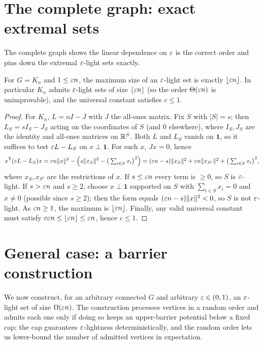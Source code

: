 \section{The complete graph: exact extremal sets}\label{sec:clique}

The complete graph shows the linear dependence on $\varepsilon$ is the correct order and pins down the
extremal $\varepsilon$-light sets exactly.

\begin{proposition}\label{prop:clique}
For $G=K_n$ and $1\le\varepsilon n$, the maximum size of an $\varepsilon$-light set is exactly
$\lfloor\varepsilon n\rfloor$. In particular $K_n$ admits $\varepsilon$-light sets of size $\lfloor\varepsilon n\rfloor$
(so the order $\Theta(\varepsilon n)$ is unimprovable), and the universal constant satisfies $c\le 1$.
\end{proposition}
\begin{proof}
For $K_n$, $L=nI-J$ with $J$ the all-ones matrix. Fix $S$ with $|S|=s$; then
$L_S=sI_S-J_S$ acting on the coordinates of $S$ (and $0$ elsewhere), where $I_S,J_S$ are the
identity and all-ones matrices on $\mathbb{R}^S$. Both $L$ and $L_S$ vanish on $\mathbf 1$, so it suffices
to test $\varepsilon L-L_S$ on $x\perp\mathbf 1$. For such $x$, $Jx=0$, hence
\[
x^{\mathsf T}(\varepsilon L-L_S)x=\varepsilon n\|x\|^2-\Big(s\|x_S\|^2-\big(\textstyle\sum_{i\in S}x_i\big)^2\Big)
=(\varepsilon n-s)\|x_S\|^2+\varepsilon n\|x_{S^{c}}\|^2+\big(\textstyle\sum_{i\in S}x_i\big)^2,
\]
where $x_S,x_{S^{c}}$ are the restrictions of $x$. If $s\le\varepsilon n$ every term is $\ge 0$, so $S$
is $\varepsilon$-light. If $s>\varepsilon n$ and $s\ge 2$, choose $x\perp\mathbf 1$ supported on $S$ with
$\sum_{i\in S}x_i=0$ and $x\ne 0$ (possible since $s\ge 2$); then the form equals
$(\varepsilon n-s)\|x\|^2<0$, so $S$ is not $\varepsilon$-light. As $\varepsilon n\ge 1$, the maximum is
$\lfloor\varepsilon n\rfloor$. Finally, any valid universal constant must satisfy $c\varepsilon n\le\lfloor\varepsilon n\rfloor\le\varepsilon n$, hence $c\le 1$.
\end{proof}

\section{General case: a barrier construction}\label{sec:general}

We now construct, for an arbitrary connected $G$ and arbitrary $\varepsilon\in(0,1)$, an $\varepsilon$-light set
of size $\Omega(\varepsilon n)$. The construction processes vertices in a random order and admits each one
only if doing so keeps an upper-barrier potential below a fixed cap; the cap guarantees
$\varepsilon$-lightness deterministically, and the random order lets us lower-bound the number of admitted
vertices in expectation.

